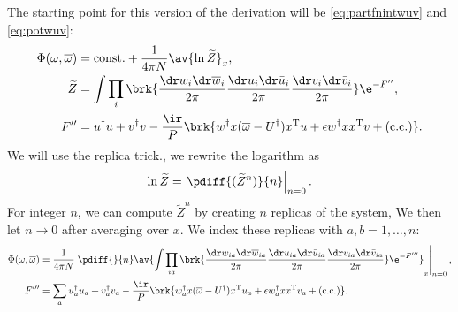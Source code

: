 \documentclass[12pt]{article}
\newcommand{\dg}{^\dagger}
\newcommand{\trans}{^\mathrm{T}}
\newcommand{\omb}{\overline{\omega}}
\newcommand{\dw}{\dr w}
\newcommand{\dwb}{\dr\overline{w}}
\newcommand{\du}{\dr u}
\newcommand{\dub}{\dr\bar{u}}
\newcommand{\dv}{\dr v}
\newcommand{\dvb}{\dr\bar{v}}
\begin{document}
The starting point for this version of the derivation will be \eqref{eq:partfnintwuv} and \eqref{eq:potwuv}:
%
\begin{equation}\label{eq:phiint}
  \begin{aligned}
    \Phi(\omega,\omb) &= \text{const.} + \frac{1}{4\pi N} \av{\ln \widetilde{Z}}_x, \\
    \widetilde{Z} &= \int \prod_i\brk{ \frac{\dw_i\dwb_i}{2\pi} \frac{\du_i\dub_i}{2\pi} \frac{\dv_i\dvb_i}{2\pi} } \e^{-F''}, \\
    F'' &=  u\dg u + v\dg v -\frac{\ir}{P}\brk{ w\dg x(\omb-U\dg)x\trans u + \epsilon w\dg xx\trans v + (\text{c.c.}) }.
  \end{aligned}
\end{equation}
%
We will use the replica trick., \ie we rewrite the logarithm as
%
\begin{equation}\label{eq:replicatrick}
  \ln \widetilde{Z} = \left. \pdiff{( \widetilde{Z}^n )}{n}\right\rvert_{n=0}.
\end{equation}
%
For integer $n$, we can compute $\widetilde{Z}^n$ by creating $n$ replicas of the system,
We then let $n\to0$ after averaging over $x$.
We index these replicas with $a,b=1,\ldots,n$:
%
\begin{equation}\label{eq:phirep}
    \begin{aligned}
    \Phi(\omega,\omb) &= \frac{1}{4\pi N}  \left.\pdiff{}{n}\av{
       \int \prod_{ia}\brk{ \frac{\dw_{ia}\dwb_{ia}}{2\pi} \frac{\du_{ia}\dub_{ia}}{2\pi} \frac{\dv_{ia}\dvb_{ia}}{2\pi} } \e^{-F'''}
       }_x\right\rvert_{n=0}, \\
    F''' &= \sum_a  u_a\dg u_a + v_a\dg v_a -\frac{\ir}{P}\brk{ w_a\dg x(\omb-U\dg)x\trans u_a + \epsilon w_a\dg xx\trans v_a + (\text{c.c.}) }.
  \end{aligned}
\end{equation}
%
\end{document}
